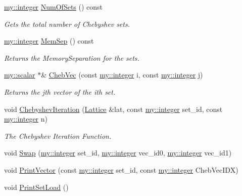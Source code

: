 \begin{DoxyCompactItemize}
\hyperlink{namespacemy_a42365393c537edae1e89d20ff90d1923}{my\+::integer} \hyperlink{classNumCal_1_1ChebyshevSet_a345e815f911c44fd07a88392b2cb7dd1}{Num\+Of\+Sets} () const 
\begin{DoxyCompactList}\small\item\em Gets the total number of Chebyshev sets. \end{DoxyCompactList}\item 
\hyperlink{namespacemy_a42365393c537edae1e89d20ff90d1923}{my\+::integer} \hyperlink{classNumCal_1_1ChebyshevSet_ac3f3d1c342654b271f6ae2d0810d3ab9}{Mem\+Sep} () const 
\begin{DoxyCompactList}\small\item\em Returns the Memory\+Separation for the sets. \end{DoxyCompactList}\item 
\hyperlink{namespacemy_a12d9dde7e2fb58fbd11051705c382a86}{my\+::scalar} $\ast$\& \hyperlink{classNumCal_1_1ChebyshevSet_a5fbbe31b3dba2cf8ee37f6fe91552bb3}{Cheb\+Vec} (const \hyperlink{namespacemy_a42365393c537edae1e89d20ff90d1923}{my\+::integer} i, const \hyperlink{namespacemy_a42365393c537edae1e89d20ff90d1923}{my\+::integer} j)
\begin{DoxyCompactList}\small\item\em Returns the jth vector of the ith set. \end{DoxyCompactList}\item 
void \hyperlink{classNumCal_1_1ChebyshevSet_a0d2a516512c91bfd5a63500848c925b8}{Chebyshev\+Iteration} (\hyperlink{classNumCal_1_1Lattice}{Lattice} \&lat, const \hyperlink{namespacemy_a42365393c537edae1e89d20ff90d1923}{my\+::integer} set\+\_\+id, const \hyperlink{namespacemy_a42365393c537edae1e89d20ff90d1923}{my\+::integer} n)
\begin{DoxyCompactList}\small\item\em The Chebyshev Iteration Function. \end{DoxyCompactList}\item 
void \hyperlink{classNumCal_1_1ChebyshevSet_aefe3d2d562bff549628793f26d56e105}{Swap} (\hyperlink{namespacemy_a42365393c537edae1e89d20ff90d1923}{my\+::integer} set\+\_\+id, \hyperlink{namespacemy_a42365393c537edae1e89d20ff90d1923}{my\+::integer} vec\+\_\+id0, \hyperlink{namespacemy_a42365393c537edae1e89d20ff90d1923}{my\+::integer} vec\+\_\+id1)
\item 
void \hyperlink{classNumCal_1_1ChebyshevSet_ae4fc320b558a0f0200ae01917eefce72}{Print\+Vector} (const \hyperlink{namespacemy_a42365393c537edae1e89d20ff90d1923}{my\+::integer} set\+\_\+id, const \hyperlink{namespacemy_a42365393c537edae1e89d20ff90d1923}{my\+::integer} Cheb\+Vec\+I\+D\+X)
\item 
void \hyperlink{classNumCal_1_1ChebyshevSet_ad355256a1dec051aba287cd40a93097e}{Print\+Set\+Load} ()
\end{DoxyCompactItemize}
